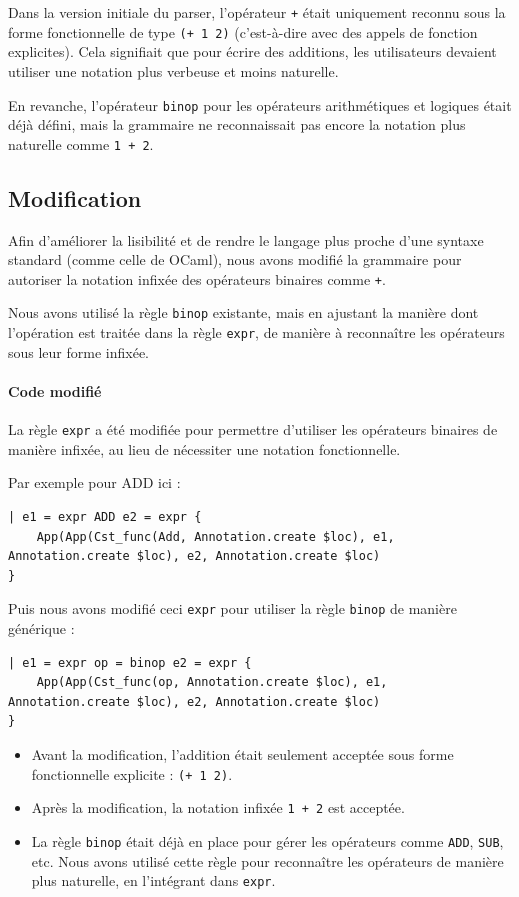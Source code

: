 Dans la version initiale du parser, l'opérateur \texttt{+} était uniquement reconnu sous la forme fonctionnelle de type \texttt{(+ 1 2)} (c'est-à-dire avec des appels de fonction explicites). Cela signifiait que pour écrire des additions, les utilisateurs devaient utiliser une notation plus verbeuse et moins naturelle.

En revanche, l'opérateur \texttt{binop} pour les opérateurs arithmétiques et logiques était déjà défini, mais la grammaire ne reconnaissait pas encore la notation plus naturelle comme \texttt{1 + 2}.

\subsection*{Modification}
Afin d'améliorer la lisibilité et de rendre le langage plus proche d'une syntaxe standard (comme celle de OCaml), nous avons modifié la grammaire pour autoriser la notation infixée des opérateurs binaires comme \texttt{+}.

Nous avons utilisé la règle \texttt{binop} existante, mais en ajustant la manière dont l'opération est traitée dans la règle \texttt{expr}, de manière à reconnaître les opérateurs sous leur forme infixée.

\paragraph{Code modifié}
La règle \texttt{expr} a été modifiée pour permettre d'utiliser les opérateurs binaires de manière infixée, au lieu de nécessiter une notation fonctionnelle.

Par exemple pour ADD ici :
\begin{lstlisting}
| e1 = expr ADD e2 = expr {
    App(App(Cst_func(Add, Annotation.create $loc), e1, Annotation.create $loc), e2, Annotation.create $loc)
}
\end{lstlisting}

Puis nous avons modifié ceci \texttt{expr} pour utiliser la règle \texttt{binop} de manière générique :
\begin{lstlisting}
| e1 = expr op = binop e2 = expr {
    App(App(Cst_func(op, Annotation.create $loc), e1, Annotation.create $loc), e2, Annotation.create $loc)
}
\end{lstlisting}

\begin{itemize}
    \item Avant la modification, l'addition était seulement acceptée sous forme fonctionnelle explicite : \texttt{(+ 1 2)}.
    \item Après la modification, la notation infixée \texttt{1 + 2} est acceptée.
    \item La règle \texttt{binop} était déjà en place pour gérer les opérateurs comme \texttt{ADD}, \texttt{SUB}, etc. Nous avons utilisé cette règle pour reconnaître les opérateurs de manière plus naturelle, en l'intégrant dans \texttt{expr}.
\end{itemize}

